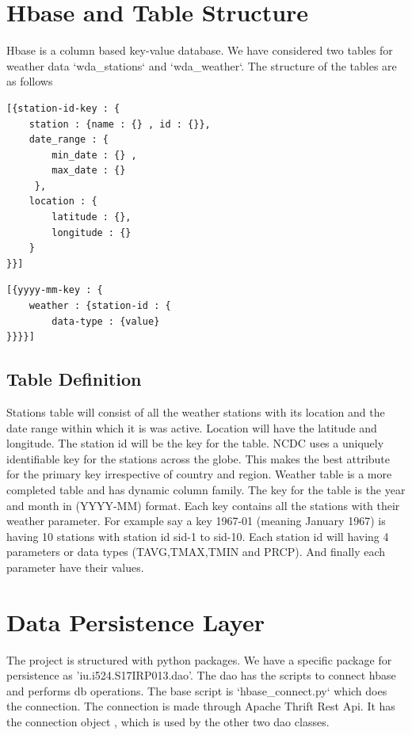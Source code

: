 \documentclass[9pt,twocolumn,twoside]{../../styles/osajnl}
\begin{document}
\section{Hbase and Table Structure}
Hbase \cite{hbase} is a column based key-value database. We have considered two tables for weather data `wda\_stations` and `wda\_weather`. The structure of the tables are as follows\newline
\begin{lstlisting}[label=JSON,caption=WDA\_STATIONS Table,breaklines=true]
[{station-id-key : {
	station : {name : {} , id : {}},
	date_range : {
		min_date : {} ,
		max_date : {}
	 },
	location : {
		latitude : {},
	 	longitude : {}
	}
}}]
\end{lstlisting}
\begin{lstlisting}[label=JSON,caption=WDA\_WEATHER Table,breaklines=true]
[{yyyy-mm-key : {
	weather : {station-id : {
		data-type : {value}			
}}}}]
\end{lstlisting}
\subsection{Table Definition}
Stations table will consist of all the weather stations with its location and the date range within which it is was active. Location will have the latitude and longitude. The station id will be the key for the table. NCDC uses a uniquely identifiable key for the stations across the globe. This makes the best attribute for the primary key irrespective of country and region. Weather table is a more completed table and has dynamic column family. The key for the table is the year and month in (YYYY-MM) format. Each key contains all the stations with their weather parameter. For example say a key 1967-01 (meaning January 1967) is having 10 stations with station id sid-1 to sid-10. Each station id will having 4 parameters or data types (TAVG,TMAX,TMIN and PRCP). And finally each parameter have their values. 

\section{Data Persistence Layer}
The project is structured with python packages. We have a specific package for persistence as 'iu.i524.S17IRP013.dao'. The dao has the scripts to connect hbase and performs db operations. The base script is `hbase\_connect.py` which does the connection. The connection is made through Apache Thrift Rest Api. It has the connection object , which is used by the other two dao classes.
\end{document}
